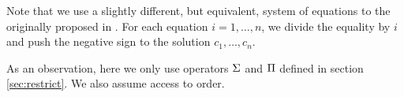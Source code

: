 Note that we use a slightly different, but equivalent, system of equations to the originally proposed in \cite{Csanky76}.
For each equation $i=1, \ldots, n$, we divide the equality by $i$ and push the negative sign to the solution $c_1, \ldots, c_n$.

As an observation, here we only use operators $\Sigma$ and $\Pi$ defined in section \ref{sec:restrict}. 
We also assume access to order.
